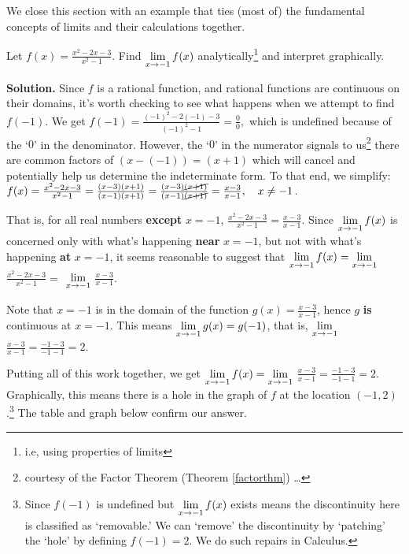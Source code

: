\medskip

We close this section with an example that ties (most of) the fundamental concepts of limits and their calculations together.

\medskip

\begin{ex} \label{rationallimit}  Let  $f(x) =  \frac{x^2-2x-3}{x^2-1}$.  Find $\displaystyle{\lim_{x \rightarrow -1} f(x)}$ analytically\footnote{i.e, using properties of limits} and interpret graphically.

\medskip

{\bf Solution.}  Since $f$ is a rational function, and rational functions are continuous on their domains, it's worth checking to see what happens when we attempt to find $f(-1)$.  We get  $f(-1) = \frac{(-1)^2 - 2(-1)-3}{(-1)^2-1} = \frac{0}{0},$ which is undefined because of the `$0$' in the denominator.  However, the `$0$' in the numerator signals to us\footnote{courtesy of the Factor Theorem (Theorem \ref{factorthm}) \ldots} there are common factors of $(x-(-1)) = (x+1)$ which will cancel and potentially help us determine the indeterminate form.  To that end, we simplify: $f(x) =  \frac{x^2-2x-3}{x^2-1} = \frac{(x-3)(x+1)}{(x-1)(x+1)} = \frac{(x-3)\cancel{(x+1)}}{(x-1)\cancel{(x+1)}} = \frac{x-3}{x-1}, \quad x \neq -1$. 

\medskip

That is, for all real numbers \textbf{except} $x = -1$, $\frac{x^2-2x-3}{x^2-1} = \frac{x-3}{x-1}$.   Since $\displaystyle{\lim_{x \rightarrow -1} f(x)}$ is concerned only with what's happening \textbf{near} $x = -1$, but not with what's happening \textbf{at} $x = -1$, it seems reasonable to suggest that $\displaystyle{\lim_{x \rightarrow -1} f(x) =  \lim_{x \rightarrow -1}}$  $\frac{x^2-2x-3}{x^2-1} =$  $\displaystyle{\lim_{x \rightarrow -1}}$ $\frac{x-3}{x-1}$.

\medskip

Note that $x = -1$ is in the domain of the function $g(x) = \frac{x-3}{x-1}$, hence $g$  \textbf{is} continuous at $x = -1$.   This means $\displaystyle{\lim_{x \rightarrow -1} g(x) = g(-1)}$, that is, $\displaystyle{\lim_{x \rightarrow -1}}$ $\frac{x-3}{x-1} = \frac{-1-3}{-1-1} = 2$.

\medskip

Putting all of this work together, we get $\displaystyle{\lim_{x \rightarrow -1} f(x) =   \lim_{x \rightarrow -1}}$ $ \frac{x-3}{x-1}  =  \frac{-1-3}{-1-1} = 2$.   Graphically, this means there is a hole in the graph of $f$ at the location $(-1,2)$.\footnote{Since $f(-1)$ is undefined but  $\displaystyle{\lim_{x \rightarrow -1} f(x)}$ exists means the discontinuity here is classified as `removable.'  We can `remove' the discontinuity by `patching' the `hole' by defining $f(-1) = 2$. We do such repairs in Calculus.}  The table and graph below confirm our answer.


\end{ex}
